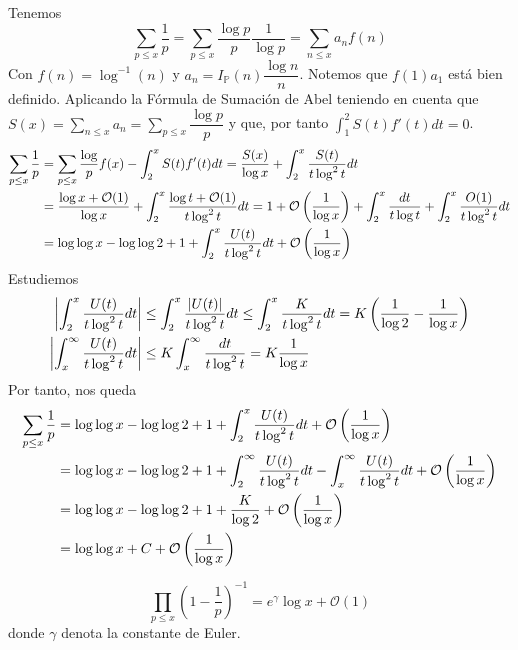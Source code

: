 \documentclass[TAN.tex]{subfiles}
\begin{document}
\begin{dem}
Tenemos
$$
\sum_{p≤x} \frac{1}{p} = \sum_{p≤x} \frac{\log p}{p}\frac{1}{\log p} = \sum_{n≤x} a_n f(n)
$$
Con $f(n)=\log^{-1}(n)$ y $a_n = I_{\mathbb{P}}(n)\dfrac{\log n}{n}$. Notemos que $f(1)a_1$ está bien definido. Aplicando la Fórmula de Sumación de Abel teniendo en cuenta que $S(x)=\sum_{n\leq x}a_n = \sum_{p\leq x}\dfrac{\log p}{p}$ y que, por tanto $\int_1^2S(t)f'(t)dt = 0$.
\begin{align*}
\sum_{p\leq x}\frac{1}{p}&= \sum_{p\leq x}\dfrac{\log}{p}f(x)-\int_2^x S(t)f'(t)dt = \frac{S(x)}{\log x} +\int_2^x \frac{S(t)}{t\log^2t}dt \\
&=\frac{\log x + \mathcal{O}(1)}{\log x} +\int_2^x \frac{\log t + \mathcal{O}(1)}{t\log^2t}dt = 1 + \mathcal{O}\left({\frac{1}{\log x}}\right)+\int_2^x\frac{dt}{t\log t}+\int_2^x\frac{O(1)}{t\log^2 t}dt\\
&=\log\log x - \log\log 2 +1 + \int_2^x\frac{U(t)}{t\log^2 t}dt+ \mathcal{O}\left({\frac{1}{\log x}}\right)
\end{align*}
Estudiemos 
\begin{align*}
\left|\int_2^x\frac{U(t)}{t\log^2 t}dt\right|&\leq \int_2^x\frac{\left|U(t)\right|}{t\log^2 t}dt \leq \int_2^x\frac{K}{t\log^2 t}dt = K\left(\frac{1}{\log 2}-\frac{1}{\log x} \right)\\
\left|\int_x^\infty \frac{U(t)}{t\log^2 t}dt\right|&\leq K\int_x^{\infty}\frac{dt}{t\log^2t} = K\frac{1}{\log x}
\end{align*}
Por tanto, nos queda
\begin{align*}
\sum_{p\leq x}\frac{1}{p} &=  \log\log x - \log\log 2 +1 + \int_2^x\frac{U(t)}{t\log^2 t}dt+ \mathcal{O}\left({\frac{1}{\log x}}\right)\\
&=\log\log x - \log\log 2 +1 + \int_2^\infty\frac{U(t)}{t\log^2 t}dt- \int_x^\infty\frac{U(t)}{t\log^2 t}dt+\mathcal{O}\left({\frac{1}{\log x}}\right)\\
&=\log\log x - \log\log 2 +1 + \frac{K}{\log 2} + \mathcal{O}\left({\frac{1}{\log x}}\right)\\
&=\log\log x +C+ \mathcal{O}\left({\frac{1}{\log x}}\right)
\end{align*}
\end{dem}
\begin{teorema}
\[ \prod_{p≤x} \left(1-\frac{1}{p}\right)^{-1} = e^γ\log x + \mathcal{O}(1) \]
donde $γ$ denota la constante de Euler.
\end{teorema}
\end{document}
